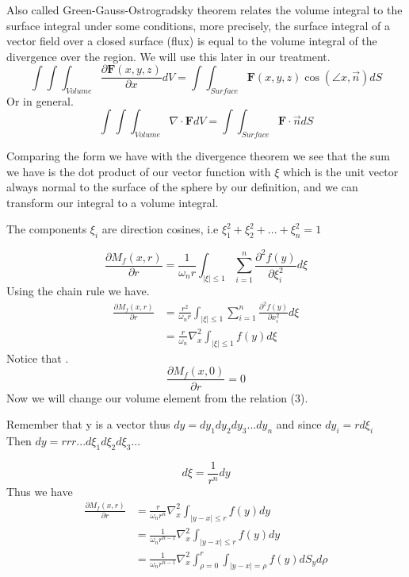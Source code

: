 \documentclass[]{article}
\begin{document}
\begin{theorem}
    Also called Green-Gauss-Ostrogradsky theorem relates the volume integral to the surface integral under some conditions, more precisely, the surface integral of a vector field over a closed surface (flux) is equal to the volume integral of the divergence over the region. We will use this later in our treatment.
    \[
        \int\int\int_{Volume} \frac{\partial \textbf{F}(x,y,z)}{\partial x}dV = \int\int_{Surface} \textbf{F}(x,y,z)\cos(\angle x,\vec{n}) dS    
    \]
    Or in general.
    \[
        \int\int\int_{Volume} \nabla \cdot \textbf{F} dV = \int\int_{Surface} \textbf{F}\cdot \vec{n} dS
    \]
\end{theorem}

Comparing the form we have with the divergence theorem we see that the sum we have is the dot product of our vector function with $\xi$
which is the unit vector always normal to the surface of the sphere by our definition, and we can transform our integral to a volume integral.
\begin{enrichment*}{}
    The components $\xi_i$ are direction cosines, i.e $\xi_{1}^{2}+\xi_{2}^{2}+...+\xi_{n}^{2} = 1$
\end{enrichment*}
\[
    \frac{\partial M_f (x,r)}{\partial r} = \frac{1}{\omega_n r} \int_{|\xi|\leq 1} \sum_{i=1}^{n} \frac{\partial^2 f(y)}{\partial \xi_{i}^{2}} d\xi    
\]
Using the chain rule we have.
\begin{align*}
\frac{\partial M_f (x,r)}{\partial r} &= \frac{r^2}{\omega_n r} \int_{|\xi|\leq 1} \sum_{i=1}^{n} \frac{\partial^2 f(y)}{\partial x_{i}^{2}} d\xi
\\
&=\frac{r}{\omega_n} \nabla_{x}^{2} \int_{|\xi|\leq 1} f(y)d\xi
\end{align*}
Notice that .
\[
    \frac{\partial M_f (x,0)}{\partial r} = 0    
\]
Now we will change our volume element from the relation (3).
\begin{enrichment*}{}
    Remember that y is a vector thus $dy = dy_1 dy_2 dy_3 ...dy_n$ and since $dy_i = rd\xi_i$ 
    \\
    Then $dy = rrr...d\xi_1 d\xi_2 d\xi_3 ...$
\end{enrichment*}
\[
    d\xi = \frac{1}{r^n}dy    
\]
Thus we have 
\begin{align*}
\frac{\partial M_f (x,r)}{\partial r} &= \frac{r}{\omega_n r^n} \nabla_{x}^{2} \int_{|y-x|\leq r} f(y)dy
\\
&= \frac{1}{\omega_n r^{n-1}} \nabla_{x}^{2} \int_{|y-x|\leq r} f(y)dy
\\
&= \frac{1}{\omega_n r^{n-1}} \nabla_{x}^{2} \int_{\rho = 0}^{r} \int_{|y-x| = \rho} f(y)dS_y d\rho
\end{align*}
\end{document}
